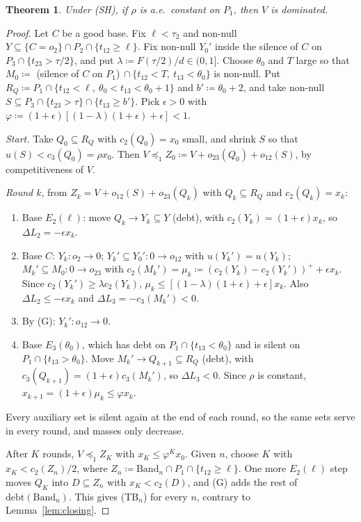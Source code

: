 \documentclass[11pt]{article}
\newtheorem{theorem}{Theorem}
\theoremstyle{definition}\newtheorem{definition}[theorem]{Definition}
\theoremstyle{remark}\newtheorem{remark}[theorem]{Remark}
\begin{document}
\begin{theorem}\label{thm:rho}
Under (SH), if $\rho$ is a.e.\ constant on $P_1$, then $V$ is dominated.
\end{theorem}
\begin{proof}
Let $C$ be a good base. Fix $\ell<\tau_2$ and non-null
$Y\subseteq\{C=o_2\}\cap P_2\cap\{t_{12}\ge\ell\}$. Fix non-null $Y_0'$ inside
the silence of $C$ on $P_3\cap\{t_{23}>\tau/2\}$, and put
$\lambda\coloneqq F(\tau/2)/d\in(0,1]$. Choose $\theta_0$ and $T$ large so
that $M_0\coloneqq$ (silence of $C$ on $P_1$)$\,\cap\{t_{12}<T,\ t_{13}<\theta_0\}$
is non-null. Put
$R_Q\coloneqq P_1\cap\{t_{12}<\ell,\ \theta_0<t_{13}<\theta_0+1\}$ and $b'\coloneqq\theta_0+2$,
and take non-null $S\subseteq P_3\cap\{t_{23}>\tau\}\cap\{t_{13}\ge b'\}$.
Pick $\epsilon>0$ with
$\varphi\coloneqq(1+\epsilon)[(1-\lambda)(1+\epsilon)+\epsilon]<1$.

\emph{Start.} Take $Q_0\subseteq R_Q$ with $c_2(Q_0)=x_0$ small, and shrink
$S$ so that $u(S)<c_3(Q_0)=\rho x_0$. Then
$V\preceq_1Z_0\coloneqq V+o_{23}(Q_0)+o_{12}(S)$, by competitiveness of $V$.

\emph{Round $k$}, from $Z_k=V+o_{12}(S)+o_{23}(Q_k)$ with $Q_k\subseteq R_Q$
and $c_2(Q_k)=x_k$:
\begin{enumerate}[label=(\alph*),leftmargin=*,itemsep=2pt]
\item Base $E_2(\ell)$: move $Q_k\to Y_k\subseteq Y$ (debt), with
$c_2(Y_k)=(1+\epsilon)x_k$, so $\Delta L_2=-\epsilon x_k$.
\item Base $C$: $Y_k\colon o_2\to0$; $Y_k'\subseteq Y_0'\colon0\to o_{12}$ with
$u(Y_k')=u(Y_k)$; $M_k'\subseteq M_0\colon0\to o_{23}$ with
$c_2(M_k')=\mu_k\coloneqq(c_2(Y_k)-c_2(Y_k'))^++\epsilon x_k$. Since
$c_2(Y_k')\ge\lambda c_2(Y_k)$, $\mu_k\le[(1-\lambda)(1+\epsilon)+\epsilon]x_k$.
Also $\Delta L_2\le-\epsilon x_k$ and $\Delta L_3=-c_3(M_k')<0$.
\item By (G): $Y_k'\colon o_{12}\to0$.
\item Base $E_3(\theta_0)$, which has debt on $P_1\cap\{t_{13}<\theta_0\}$ and
is silent on $P_1\cap\{t_{13}>\theta_0\}$. Move $M_k'\to Q_{k+1}\subseteq R_Q$
(debt), with $c_3(Q_{k+1})=(1+\epsilon)c_3(M_k')$, so $\Delta L_3<0$. Since
$\rho$ is constant, $x_{k+1}=(1+\epsilon)\mu_k\le\varphi x_k$.
\end{enumerate}
Every auxiliary set is silent again at the end of each round, so the same
sets serve in every round, and masses only decrease.

After $K$ rounds, $V\preceq_1Z_K$ with $x_K\le\varphi^Kx_0$. Given $n$, choose
$K$ with $x_K<c_2(Z_n)/2$, where
$Z_n\coloneqq\mathrm{Band}_n\cap P_1\cap\{t_{12}\ge\ell\}$. One more
$E_2(\ell)$ step moves $Q_K$ into $D\subseteq Z_n$ with $x_K<c_2(D)$, and (G)
adds the rest of $\mathrm{debt}(\mathrm{Band}_n)$. This gives (TB$_n$) for
every $n$, contrary to Lemma~\ref{lem:closing}.
\end{proof}
\end{document}
